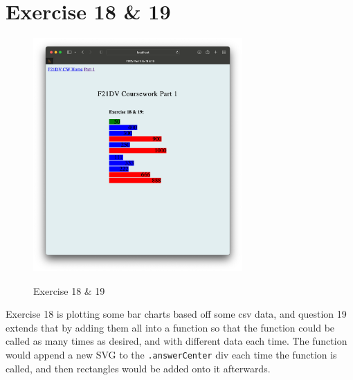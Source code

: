 \documentclass{scrreprt}
\begin{document}
\section{Exercise 18 \& 19}
\begin{figure}[!ht]
    \centering
    \includegraphics[width = 8cm]{images/ex18.png}
    \label{fig:ex18}
    \caption{Exercise 18 \& 19}
\end{figure}
\FloatBarrier

Exercise 18 is plotting some bar charts based off some csv data, and question 19 extends that by adding
them all into a function so that the function could be called as many times as desired, and with different
data each time. The function would append a new SVG to the \verb|.answerCenter| div each time the function
is called, and then rectangles would be added onto it afterwards.

\newpage
\end{document}
